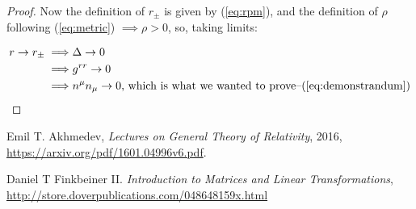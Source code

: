 \documentclass[]{article}
\begin{document}
\begin{proof}
Now the definition of $r_{\pm}$ is given by (\ref{eq:rpm}), and the definition of $\rho$ following (\ref{eq:metric}) $\implies \rho>0$, so, taking limits:

\begin{align*}
r\rightarrow r_{\pm} \implies& \Delta \rightarrow 0 \\
\implies& g^{rr} \rightarrow 0 \\
\implies& n^{\mu}n_{\mu} \rightarrow 0 \text{, which is what we wanted to prove--(\ref{eq:demonstrandum})}
\end{align*}
\end{proof}


\begin{thebibliography}{9}
	
	Emil T. Akhmedev,
	\emph{Lectures on General Theory of Relativity},
	2016,
	\url{https://arxiv.org/pdf/1601.04996v6.pdf}.
	
	Daniel T Finkbeiner II.
	\emph{Introduction to Matrices and Linear Transformations},
	\url{http://store.doverpublications.com/048648159x.html}
	
\end{thebibliography}
\end{document}

